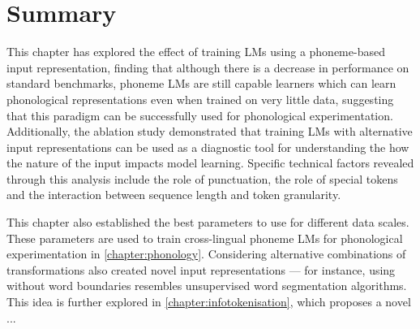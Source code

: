 \section{Summary}

This chapter has explored the effect of training LMs using a phoneme-based input representation, finding that although there is a decrease in performance on standard benchmarks, phoneme LMs are still capable learners which can learn phonological representations even when trained on very little data, suggesting that this paradigm can be successfully used for phonological experimentation. Additionally, the ablation study demonstrated that training LMs with alternative input representations can be used as a diagnostic tool for understanding the how the nature of the input impacts model learning. Specific technical factors revealed through this analysis include the role of punctuation, the role of special tokens and the interaction between sequence length and token granularity.


This chapter also established the best parameters to use for different data scales. These parameters are used to train cross-lingual phoneme LMs for phonological experimentation in \cref{chapter:phonology}. Considering alternative combinations of transformations also created novel input representations --- for instance, using \bpe without word boundaries resembles unsupervised word segmentation algorithms. This idea is further explored in \cref{chapter:infotokenisation}, which proposes a novel ...




